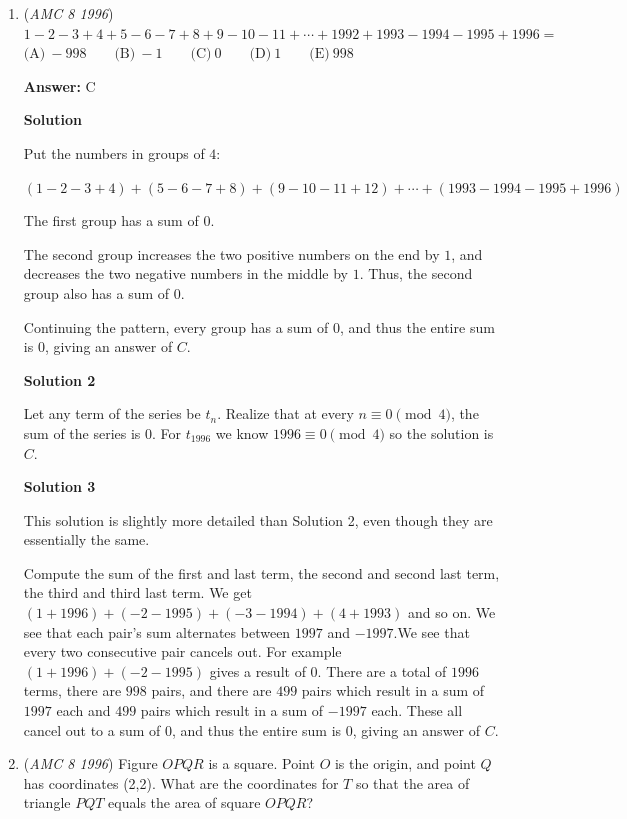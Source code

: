 \begin{enumerate}
 


	\item (\textit{AMC 8 1996}) $1-2-3+4+5-6-7+8+9-10-11+\cdots + 1992+1993-1994-1995+1996=$
$\text{(A)}\ -998 \qquad \text{(B)}\ -1 \qquad \text{(C)}\ 0 \qquad \text{(D)}\ 1 \qquad \text{(E)}\ 998$

 \textbf{Answer: }C



\textbf{Solution}

Put the numbers in groups of $4$:

 $(1-2-3+4)+(5-6-7+8)+(9-10-11+ 12) + \cdots + (1993-1994-1995+1996)$

 The first group has a sum of $0$.

 The second group increases the two positive numbers on the end by $1$, and decreases the two negative numbers in the middle by $1$.  Thus, the second group also has a sum of $0$.

 Continuing the pattern, every group has a sum of $0$, and thus the entire sum is $0$, giving an answer of $\boxed{C}$.

 



\textbf{Solution 2}

Let any term of the series be $t_n$. Realize that at every $n\equiv0 \pmod4$, the sum of the series is 0. For $t_{1996}$ we know $1996\equiv0 \pmod4$ so the solution is $\boxed{C}$.

 



\textbf{Solution 3}

This solution is slightly more detailed than Solution 2, even though they are essentially the same.

 Compute the sum of the first and last term, the second and second last term, the third and third last term. We get $(1+1996)+(-2-1995)+(-3-1994)+(4+1993)$ and so on. We see that each pair's sum alternates between $1997$ and $-1997$.We see that every two consecutive pair cancels out. For example $(1+1996)+(-2-1995)$ gives a result of $0$. There are a total of $1996$ terms, there are $998$ pairs, and there are $499$ pairs which result in a sum of $1997$ each and $499$ pairs which result in a sum of $-1997$ each. These all cancel out to a sum of $0$, and thus the entire sum is $0$, giving an answer of $\boxed{C}$.

 


	\item (\textit{AMC 8 1996}) Figure $OPQR$ is a square.  Point $O$ is the origin, and point $Q$ has coordinates (2,2).  What are the coordinates for $T$ so that the area of triangle $PQT$ equals the area of square $OPQR$?



\end{enumerate}
